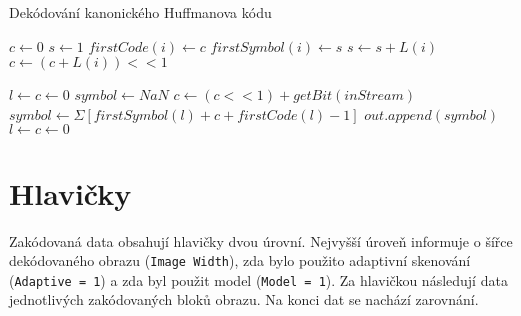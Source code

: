 \documentclass[a4paper, 11pt, fleqn]{scrartcl}
\begin{document}
        \begin{algorithm}[!h]
          \SetAlgoLined
          \DontPrintSemicolon
          \caption{Dekódování kanonického Huffmanova kódu}

          $c \leftarrow 0$\;
          $s \leftarrow 1$\;
          {
            $\textit{firstCode}(i) \leftarrow c$\;
            $\textit{firstSymbol}(i) \leftarrow s$\;
            $s \leftarrow s + L(i)$\;
            $c \leftarrow (c + L(i)) << 1$\;
          }

          $l \leftarrow c \leftarrow 0$\;
          $symbol \leftarrow NaN$\;
          {
            $c \leftarrow (c << 1) + getBit(inStream)$\;
            {
              $symbol \leftarrow \Sigma[firstSymbol(l) + c + firstCode(l) - 1]$\;
              {
                $out.append(symbol)$\;
              }
              $l \leftarrow c \leftarrow 0$\;
            }
          }

        \end{algorithm}

    \newpage

    \section{Hlavičky}
      Zakódovaná data obsahují hlavičky dvou úrovní. Nejvyšší úroveň informuje o šířce dekódovaného obrazu (\texttt{Image Width}), zda bylo použito adaptivní skenování (\texttt{Adaptive = 1}) a zda byl použit model (\texttt{Model~=~1}). Za hlavičkou následují data jednotlivých zakódovaných bloků obrazu. Na konci dat se nachází zarovnání.

      \vspace*{2em}
\end{document}
